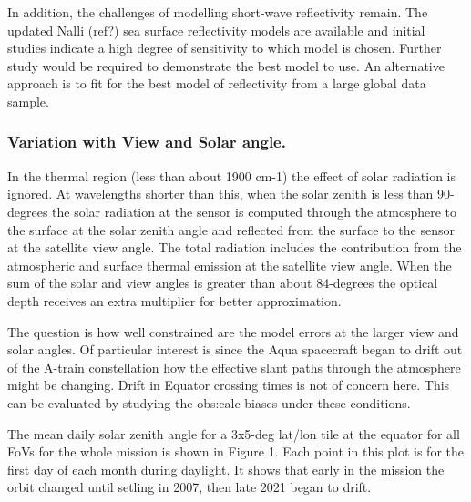 \documentclass[11pt,twocolumn]{article}
\begin{document}
In addition, the challenges of modelling short-wave reflectivity remain. The updated
Nalli (ref?) sea surface reflectivity models are available and initial studies indicate
a high degree of sensitivity to which model is chosen. Further study would be required
to demonstrate the best model to use. An alternative approach is to fit for the best
model of reflectivity from a large global data sample.

\subsubsection{Variation with View and Solar angle.}
\label{sec:orgb33ccf8}
In the thermal region (less than about 1900 cm-1) the effect of solar radiation is
ignored. At wavelengths shorter than this, when the solar zenith is less than 90-degrees
the solar radiation at the sensor is computed through the atmosphere to the surface
at the solar zenith angle and reflected from the surface to the sensor at the satellite
view angle. The total radiation includes the contribution from the atmospheric and
surface thermal emission at the satellite view angle. When the sum of the solar and
view angles is greater than about 84-degrees the optical depth receives an
extra multiplier for better approximation.

The question is how well constrained are the model errors at the larger view
and solar angles. Of particular interest is since the Aqua spacecraft began to drift
out of the A-train constellation how the effective slant paths through
the atmosphere might be changing. Drift in Equator crossing times is not of concern
here.
This can be evaluated by studying the obs:calc biases under these
conditions.

The mean daily solar zenith angle for a 3x5-deg lat/lon tile at the equator for all
FoVs for the whole mission is shown in Figure 1. Each point in this plot is for the
first day of each month during daylight.
It shows that early in the mission the orbit changed until
setling in 2007, then late 2021 began to drift.
\end{document}

